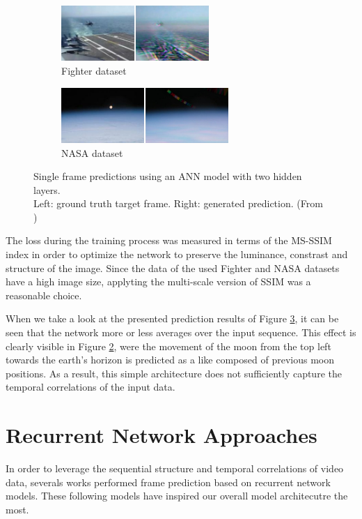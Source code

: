 \begin{figure}[htb]
\centering
\begin{subfigure}{0.5\textwidth}
  \centering
  \includegraphics[height=2.1cm]{figures/related/fighter.png}
  \caption{Fighter dataset}
  \label{fig:aan_samples_fighter}
\end{subfigure}%
\begin{subfigure}{0.5\textwidth}
  \centering
  \includegraphics[height=2.1cm]{figures/related/nasa.png}
  \caption{NASA dataset}
  \label{fig:aan_samples_nasa}
\end{subfigure}
\caption[ANN Frame Prediction]{Single frame predictions using an ANN model with two hidden layers.\\
Left: ground truth target frame. Right: generated prediction. (From \parencite{ann})}
\label{fig:aan_samples}
\end{figure}

The loss during the training process was measured in terms of the MS-SSIM index in order to optimize the network to preserve the luminance, constrast and structure of the image. Since the data of the used Fighter and NASA datasets have a high image size, applyting the multi-scale version of SSIM was a reasonable choice.

When we take a look at the presented prediction results of Figure \ref{fig:aan_samples}, it can be seen that the network more or less averages over the input sequence. This effect is clearly visible in Figure \ref{fig:aan_samples_nasa}, were the movement of the moon from the top left towards the earth's horizon is predicted as a like composed of previous moon positions. As a result, this simple architecture does not sufficiently capture the temporal correlations of the input data.

\section{Recurrent Network Approaches}

In order to leverage the sequential structure and temporal correlations of video data, severals works performed frame prediction based on recurrent network models. These following models have inspired our overall model architecutre the most.

